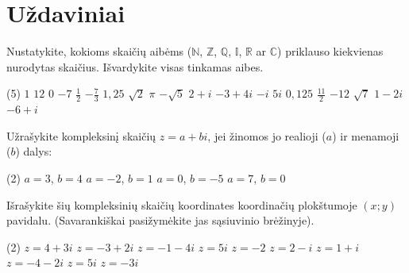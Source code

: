 \documentclass[11pt,a4paper]{scrartcl}
\begin{document}
\section{Uždaviniai}

\begin{problem}
Nustatykite, kokioms skaičių aibėms ($\mathbb{N}$, $\mathbb{Z}$, $\mathbb{Q}$, $\mathbb{I}$, $\mathbb{R}$ ar $\mathbb{C}$) priklauso kiekvienas nurodytas skaičius. Išvardykite visas tinkamas aibes.
\begin{tasks}[label={(\arabic*)}, label-offset=0.9em](5)
    \task $1$
    \task $12$
    \task $0$
    \task $-7$
    \task $\frac{1}{2}$
    \task $-\frac{7}{3}$
    \task $1{,}25$
    \task $\sqrt{2}$
    \task $\pi$
    \task $-\sqrt{5}$
    \task $2+i$
    \task $-3+4i$
    \task $-i$
    \task $5i$
    \task $0{,}125$
    \task $\frac{11}{2}$
    \task $-12$
    \task $\sqrt{7}$
    \task $1-2i$
    \task $-6+i$
\end{tasks}
\end{problem}

\setcounter{problem}{2}
\begin{problem}
Užrašykite kompleksinį skaičių $z = a + bi$, jei žinomos jo realioji ($a$) ir menamoji ($b$) dalys:
\begin{tasks}[label={(\arabic*)}, label-offset=0.9em](2)
    \task $a = 3$, $b = 4$
    \task $a = -2$, $b = 1$
    \task $a = 0$, $b = -5$
    \task $a = 7$, $b = 0$
\end{tasks}
\end{problem}

\setcounter{problem}{3}
\begin{problem}
Išrašykite šių kompleksinių skaičių koordinates koordinačių plokštumoje $(x; y)$ pavidalu. (Savarankiškai pasižymėkite jas sąsiuvinio brėžinyje).
\begin{tasks}[label={(\arabic*)}, label-offset=0.9em](2)
    \task $z = 4 + 3i$
    \task $z = -3 + 2i$
    \task $z = -1 - 4i$
    \task $z = 5i$
    \task $z = -2$
    \task $z = 2 - i$
    \task $z = 1 + i$
    \task $z = -4 - 2i$
    \task $z = 5i$
    \task $z = -3i$
\end{tasks}
\end{problem}

\newpage
\answerssection
\end{document}
